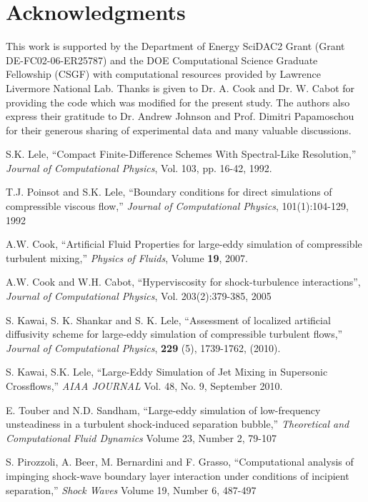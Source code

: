 \documentclass[]{aiaa-tc}%
\begin{document}
\section*{Acknowledgments}

This work is supported by the Department of Energy SciDAC2 Grant (Grant DE-FC02-06-ER25787) and the DOE Computational Science Graduate Fellowship (CSGF) with computational resources provided by Lawrence Livermore National Lab.  Thanks is given to Dr. A. Cook and Dr. W. Cabot for providing the code which was modified for the present study.  The authors also express their gratitude to Dr. Andrew Johnson and Prof. Dimitri Papamoschou for their generous sharing of experimental data and many valuable discussions.

\begin{thebibliography}{10}%
 
 	S.K. Lele, ``Compact Finite-Difference Schemes With Spectral-Like Resolution,'' \emph{Journal of Computational
	Physics}, Vol. 103, pp. 16-42, 1992.
	
	T.J. Poinsot and S.K. Lele, ``Boundary conditions for direct simulations of compressible viscous flow,'' \emph{Journal of Computational Physics}, 101(1):104-129, 1992

 	A.W. Cook,  ``Artificial Fluid Properties for large-eddy simulation of compressible turbulent mixing,'' \emph{Physics of Fluids}, Volume {\bf 19}, 2007.
	
	A.W. Cook and W.H. Cabot, ``Hyperviscosity for shock-turbulence interactions'', \emph{Journal of Computational Physics}, Vol. 203(2):379-385, 2005
 
 	S. Kawai, S. K. Shankar and S. K. Lele, ``Assessment of localized artificial diffusivity scheme for large-eddy simulation of compressible turbulent flows,'' \emph{Journal of Computational Physics}, {\bf 		229} (5), 1739-1762, (2010).
	
	S. Kawai, S.K. Lele, ``Large-Eddy Simulation of Jet Mixing in Supersonic Crossflows,'' \emph{AIAA JOURNAL} Vol. 48, No. 9, September 2010.
	
 	E. Touber and N.D. Sandham, ``Large-eddy simulation of low-frequency unsteadiness in a turbulent shock-induced separation bubble,'' \emph{Theoretical and Computational Fluid Dynamics} Volume 23, Number 2, 79-107

 	S. Pirozzoli, A. Beer, M. Bernardini and F. Grasso, ``Computational analysis of impinging shock-wave boundary layer interaction under conditions of incipient separation,'' \emph{Shock Waves} Volume 19, Number 6, 487-497


\end{thebibliography}
\end{document}

